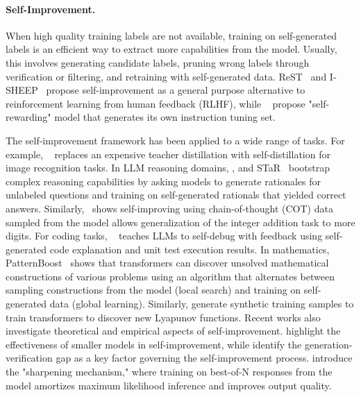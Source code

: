 \paragraph{Self-Improvement.}

When high quality training labels are not available, training on self-generated labels is an efficient way to extract more capabilities from the model. Usually, this involves generating candidate labels, pruning wrong labels through verification or filtering, and retraining with self-generated data. 
ReST~\citep{gulcehre2023reinforced} and I-SHEEP~\citep{liang2024sheep} propose self-improvement as a general purpose alternative to reinforcement learning from human feedback (RLHF), while ~\citet{yuan2024self} propose "self-rewarding" model that generates its own instruction tuning set.

The self-improvement framework has been applied to a wide range of tasks. For example, ~\citet{zhang2019your} replaces an expensive teacher distillation with self-distillation for image recognition tasks. In LLM reasoning domains, \citet{huang2022large,singh2023beyond,pang2024iterativereasoningpreferenceoptimization}, and STaR~\citep{zelikman2022star} bootstrap complex reasoning capabilities by asking models to generate rationales for unlabeled questions and training on self-generated rationals that yielded correct answers. Similarly,~\citet{zhang2023chain} shows self-improving using chain-of-thought (COT) data sampled from the model allows generalization of the integer addition task to more digits. 
For coding tasks, ~\citet{chen2023teaching} teaches LLMs to self-debug with feedback using self-generated code explanation and unit test execution results. 
In mathematics, PatternBoost~\citep{charton2024patternboost} shows that transformers can discover unsolved mathematical constructions of various problems using an algorithm that alternates between sampling constructions from the model (local search) and training on self-generated data (global learning). Similarly, \citet{alfarano2024global} generate synthetic training samples to train transformers to discover new Lyapunov functions.
Recent works also investigate theoretical and empirical aspects of self-improvement. \citet{bansal2024smaller} highlight the effectiveness of smaller models in self-improvement, while \citet{song2024mind} identify the generation-verification gap as a key factor governing the self-improvement process. \citet{huang2024selfimprovementlanguagemodelssharpening} introduce the "sharpening mechanism," where training on best-of-N responses from the model amortizes maximum likelihood inference and improves output quality.

